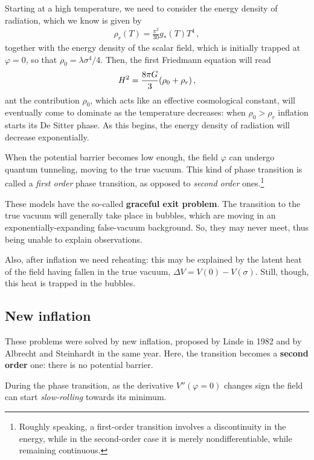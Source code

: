\documentclass[main.tex]{subfiles}
\begin{document}
Starting at a high temperature, we need to consider the energy density of radiation, which we know is given by 
%
\begin{align}
\rho _r (T) = \frac{ \pi^2}{30 } g_* (T) T^{4}
\,,
\end{align}
%
together with the energy density of the scalar field, which is initially trapped at \(\varphi = 0\), so that \(\rho_0 = \lambda \sigma^{4} /4\). 
Then, the first Friedmann equation will read 
%
\begin{align}
H^2= \frac{8 \pi G}{3} \qty(\rho_0 + \rho _r)
\,,
\end{align}
%
ant the contribution \(\rho_0 \), which acts like an effective cosmological constant, will eventually come to dominate as the temperature decreases: when \(\rho_0 > \rho_r\) inflation starts its De Sitter phase. 
As this begins, the energy density of radiation will decrease exponentially. 

When the potential barrier becomes low enough, the field \(\varphi \) can undergo quantum tunneling, moving to the true vacuum. 
This kind of phase transition is called a \emph{first order} phase transition, as opposed to \emph{second order} ones.\footnote{Roughly speaking, a first-order transition involves a discontinuity in the energy, while in the second-order case it is merely nondifferentiable, while remaining continuous.}

These models have the so-called \textbf{graceful exit problem}.  
The transition to the true vacuum will generally take place in bubbles, which are moving in an exponentially-expanding false-vacuum background. 
So, they may never meet, thus being unable to explain observations. 

Also, after inflation we need reheating: this may be explained by the latent heat of the field having fallen in the true vacuum, \(\Delta V = V(0 ) - V(\sigma )\). 
Still, though, this heat is trapped in the bubbles.
 


\subsection{New inflation}

These problems were solved by new inflation, proposed by Linde in 1982 and by Albrecht and Steinhardt in the same year.
Here, the transition becomes a \textbf{second order} one: there is no potential barrier. 

During the phase transition, as the derivative \(V'' (\varphi =0)\) changes sign the field can start \emph{slow-rolling} towards its minimum. 
\end{document}
